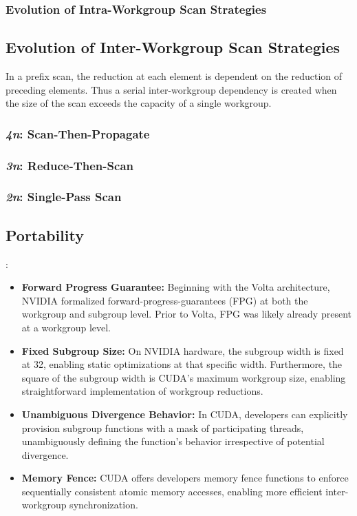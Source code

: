 \documentclass[sigconf]{acmart}
\begin{document}
\subsubsection{Evolution of Intra-Workgroup Scan Strategies}

\subsection{Evolution of Inter-Workgroup Scan Strategies}
In a prefix scan, the reduction at each element is dependent on the reduction of preceding elements. Thus a serial inter-workgroup dependency is created when the size of the scan exceeds the capacity of a single workgroup.

\subsubsection{\textit{4n}: Scan-Then-Propagate}
\cite{Sengupta2008, 10.5555/1280094.1280110, GPUGems3}
\subsubsection{\textit{3n}: Reduce-Then-Scan}
\cite{Merrill2009, 10.5555/110382.110597, 10.1145/1375527.1375559}
\subsubsection{\textit{2n}: Single-Pass Scan}
\cite{10.1145/2442516.2442539,Merrill2016}
\subsection{Portability}
\cite{sorensen_et_al:LIPIcs.CONCUR.2018.23, 10.1145/3485508, NvidiaCudaGuide, NvidiaVoltaWhitepaper}:
\begin{itemize}
    \item \textbf{Forward Progress Guarantee:} Beginning with the Volta architecture, NVIDIA formalized forward-progress-guarantees (FPG) at both the workgroup and subgroup level. Prior to Volta, FPG was likely already present at a workgroup level. 
    \item \textbf{Fixed Subgroup Size:} On NVIDIA hardware, the subgroup width is fixed at 32, enabling static optimizations at that specific width. Furthermore, the square of the subgroup width is CUDA's maximum workgroup size, enabling straightforward implementation of workgroup reductions.
    \item \textbf{Unambiguous Divergence Behavior:} In CUDA, developers can explicitly provision subgroup functions with a mask of participating threads, unambiguously defining the function's behavior irrespective of potential divergence. 
    \item \textbf{Memory Fence:} CUDA offers developers memory fence functions to enforce sequentially consistent atomic memory accesses, enabling more efficient inter-workgroup synchronization.
\end{itemize}
\end{document}
